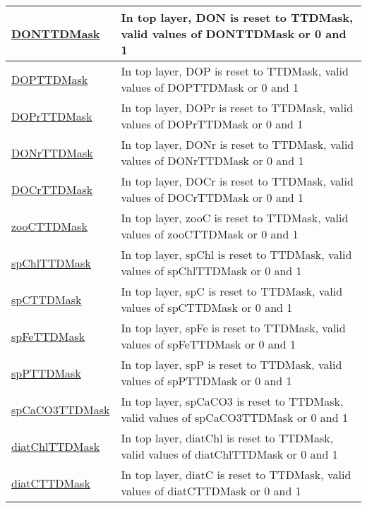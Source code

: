 {\begin{center}
\begin{longtable}{| p{2.0in} | p{4.0in} |}
    \hline
    \hyperref[subsec:var_sec_forcing_DONTTDMask]{DONTTDMask} & In top layer, DON is reset to TTDMask, valid values of DONTTDMask or 0 and 1 \\
    \hline
    \hyperref[subsec:var_sec_forcing_DOPTTDMask]{DOPTTDMask} & In top layer, DOP is reset to TTDMask, valid values of DOPTTDMask or 0 and 1 \\
    \hline
    \hyperref[subsec:var_sec_forcing_DOPrTTDMask]{DOPrTTDMask} & In top layer, DOPr is reset to TTDMask, valid values of DOPrTTDMask or 0 and 1 \\
    \hline
    \hyperref[subsec:var_sec_forcing_DONrTTDMask]{DONrTTDMask} & In top layer, DONr is reset to TTDMask, valid values of DONrTTDMask or 0 and 1 \\
    \hline
    \hyperref[subsec:var_sec_forcing_DOCrTTDMask]{DOCrTTDMask} & In top layer, DOCr is reset to TTDMask, valid values of DOCrTTDMask or 0 and 1 \\
    \hline
    \hyperref[subsec:var_sec_forcing_zooCTTDMask]{zooCTTDMask} & In top layer, zooC is reset to TTDMask, valid values of zooCTTDMask or 0 and 1 \\
    \hline
    \hyperref[subsec:var_sec_forcing_spChlTTDMask]{spChlTTDMask} & In top layer, spChl is reset to TTDMask, valid values of spChlTTDMask or 0 and 1 \\
    \hline
    \hyperref[subsec:var_sec_forcing_spCTTDMask]{spCTTDMask} & In top layer, spC is reset to TTDMask, valid values of spCTTDMask or 0 and 1 \\
    \hline
    \hyperref[subsec:var_sec_forcing_spFeTTDMask]{spFeTTDMask} & In top layer, spFe is reset to TTDMask, valid values of spFeTTDMask or 0 and 1 \\
    \hline
    \hyperref[subsec:var_sec_forcing_spPTTDMask]{spPTTDMask} & In top layer, spP is reset to TTDMask, valid values of spPTTDMask or 0 and 1 \\
    \hline
    \hyperref[subsec:var_sec_forcing_spCaCO3TTDMask]{spCaCO3TTDMask} & In top layer, spCaCO3 is reset to TTDMask, valid values of spCaCO3TTDMask or 0 and 1 \\
    \hline
    \hyperref[subsec:var_sec_forcing_diatChlTTDMask]{diatChlTTDMask} & In top layer, diatChl is reset to TTDMask, valid values of diatChlTTDMask or 0 and 1 \\
    \hline
    \hyperref[subsec:var_sec_forcing_diatCTTDMask]{diatCTTDMask} & In top layer, diatC is reset to TTDMask, valid values of diatCTTDMask or 0 and 1 \\
    \hline

\end{longtable}
\end{center}}

